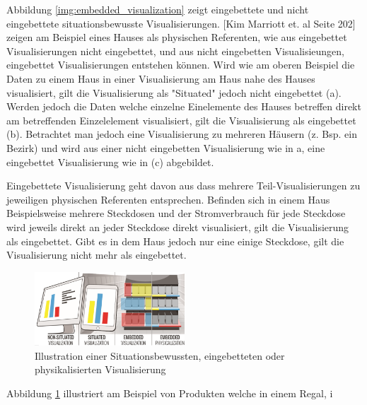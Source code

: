 Abbildung \ref{img:embedded_visualization} zeigt eingebettete und nicht eingebettete situationsbewusste Visualisierungen. [Kim Marriott et. al Seite 202] zeigen am Beispiel eines Hauses als physischen Referenten, wie aus eingebettet Visualisierungen nicht eingebettet, und aus nicht eingebetten Visualisieungen, eingebettet Visualisierungen entstehen können. Wird wie am oberen Beispiel die Daten zu einem Haus in einer Visualisierung am Haus nahe des Hauses visualisiert, gilt die Visualisierung als "Situated" jedoch nicht eingebettet (a). Werden jedoch die Daten welche einzelne Einelemente des Hauses betreffen direkt am betreffenden Einzelelement visualisiert, gilt die Visualisierung als eingebettet (b). Betrachtet man jedoch eine Visualisierung zu mehreren Häusern (z. Bsp. ein Bezirk) und wird aus einer nicht eingebetten Visualisierung wie in a, eine eingebettet Visualisierung wie in (c) abgebildet. 

Eingebettete Visualisierung geht davon aus dass mehrere Teil-Visualisierungen zu jeweiligen physischen Referenten entsprechen. Befinden sich in einem Haus Beispielsweise mehrere Steckdosen und der Stromverbrauch 
für jede Steckdose wird jeweils direkt an jeder Steckdose direkt visualisiert, gilt die Visualisierung als eingebettet. Gibt es in dem Haus jedoch nur eine einige Steckdose, gilt die Visualisierung nicht mehr als
eingebettet.

\begin{figure}[H]
	\centering
	\includegraphics[width=0.5\textwidth]{resources/fundamentals/situated_visualization/Illustration_situated_embedded_visualization.png}
	\caption{Illustration einer Situationsbewussten, eingebetteten oder physikalisierten Visualisierung \cite{Illustration_situated_embedded_visualization}}
	\label{img:Illustration_situated_embedded_visualization}
\end{figure}

Abbildung \ref{img:Illustration_situated_embedded_visualization} illustriert am Beispiel von Produkten welche in einem Regal, i



